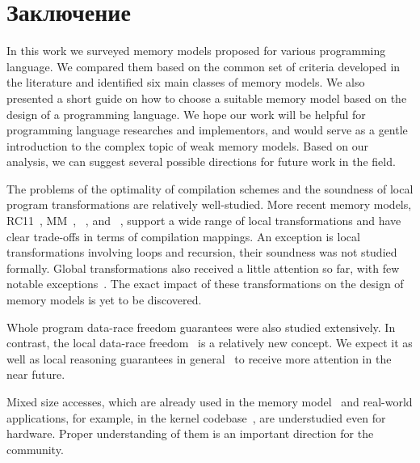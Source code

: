 \section{Заключение}
\label{sec:conclusion}

In this work we surveyed memory models 
proposed for various programming language. 
We compared them based on the common set of criteria
developed in the literature and identified 
six main classes of memory models.
We also presented a short guide on how to 
choose a suitable memory model based on 
the design of a programming language. 
We hope our work will be helpful for 
programming language researches and implementors,
and would serve as a gentle introduction 
to the complex topic of weak memory models. 
Based on our analysis, we can suggest several
possible directions for future work in the field. 

The problems of the optimality of compilation schemes
and the soundness of local program transformations are relatively well-studied.
More recent memory models,
RC11~\cite{Lahav-al:PLDI17},
\OCaml MM~\cite{Dolan-al:PLDI18},
\Promising~\cite{Kang-al:POPL17,Lee-al:PLDI20},
and \Weakestmo~\cite{Chakraborty-Vafeiadis:POPL19},
support a wide range of local transformations and have clear 
trade-offs in terms of compilation mappings. 
An exception is local transformations involving loops and recursion, 
their soundness was not studied formally. 
Global transformations also received a little attention so far,
with few notable exceptions~\cite{PichonPharabod-Sewell:POPL16, Lee-al:PLDI20}.
The exact impact of these transformations on the design of 
memory models is yet to be discovered. 

Whole program data-race freedom guarantees were also studied extensively.
In contrast, the local data-race freedom~\cite{Dolan-al:PLDI18} 
is a relatively new concept. 
We expect it as well as local reasoning guarantees 
in general~\cite{Dodds-al:ESOP18, Jagadeesan-al:OOPSLA2020, Cho-al:PLDI21} 
to receive more attention in the near future.  

Mixed size accesses\cite{Flur-al:POPL17},
which are already used in the \JS memory model~\cite{Watt-al:PLDI2020}
and real-world applications, for example, in the \Linux kernel codebase~\cite{Flur-al:POPL17},
are understudied even for hardware.
Proper understanding of them is an important direction for the community. 

